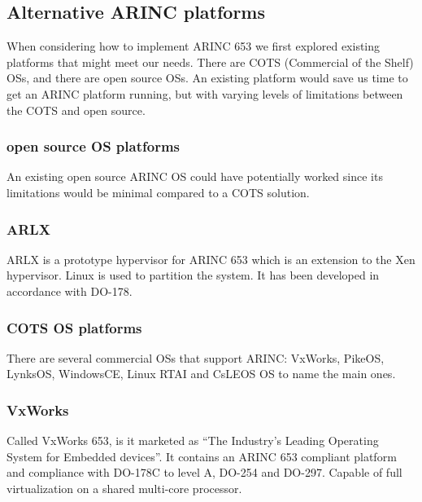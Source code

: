 \subsection{Alternative ARINC platforms}
When considering how to implement ARINC 653 we first explored existing platforms that might meet our needs.
There are COTS (Commercial of the Shelf) OSs, and there are open source OSs.
An existing platform would save us time to get an ARINC platform running,
but with varying levels of limitations between the COTS and open source.

\subsubsection{open source OS platforms}
An existing open source ARINC OS could have potentially worked since its limitations would be minimal
compared to a COTS solution. %

\subsubsection{ARLX}
ARLX is a prototype hypervisor for ARINC 653 which is an extension to the Xen hypervisor.
Linux is used to partition the system.
It has been developed in accordance with DO-178.

\subsubsection{COTS OS platforms}
There are several commercial OSs that support ARINC:
VxWorks, PikeOS, LynksOS, WindowsCE, Linux RTAI and CsLEOS OS to name the main ones.

\subsubsection{VxWorks}
Called VxWorks 653, is it marketed as ``The Industry's Leading Operating System for Embedded devices''.
It contains an ARINC 653 compliant platform and compliance with DO-178C to level A, DO-254 and DO-297.
Capable of full virtualization on a shared multi-core processor.

